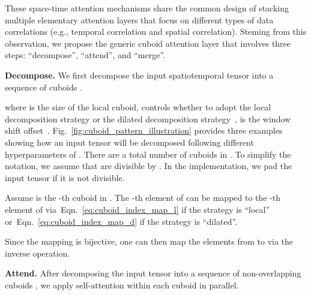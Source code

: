 \documentclass{article}
\newcommand{\figref}[1]{Fig.~\ref{#1}}
\newcommand{\eqnref}[1]{Eqn.~\ref{#1}}
\renewcommand{\paragraph}[1]{\textbf{#1. }}
\begin{document}
These space-time attention mechanisms share the common design of stacking multiple elementary attention layers that focus on different types of data correlations (e.g., temporal correlation and spatial correlation). Steming from this observation, we propose the generic cuboid attention layer that involves three steps: ``decompose'', ``attend'', and ``merge''.












\paragraph{Decompose}
We first decompose the input spatiotemporal tensor  into a sequence of cuboids .

where  is the size of the local cuboid,  controls whether to adopt the local decomposition strategy or the dilated decomposition strategy~\cite{bertasius2021space},  is the window shift offset~\cite{liu2021swin}.
\figref{fig:cuboid_pattern_illustration} provides three examples showing how an input tensor will be decomposed following different hyperparameters of .
There are a total number of  cuboids in . To simplify the notation, we assume that  are divisible by . In the implementation, we pad the input tensor if it is not divisible.

Assume  is the -th cuboid in . 
The -th element of  can be mapped to the -th element of  via~\eqnref{eq:cuboid_index_map_l} if the strategy is ``local'' or~\eqnref{eq:cuboid_index_map_d} if the strategy is ``dilated''. 

\begin{minipage}{0.49\textwidth}

\end{minipage}
\begin{minipage}{0.49\textwidth}

\end{minipage}



Since the mapping is bijective, one can then map the elements from  to  via the inverse operation. 



\paragraph{Attend} 
After decomposing the input tensor into a sequence of non-overlapping cuboids , we apply self-attention within each cuboid in parallel.
\end{document}
